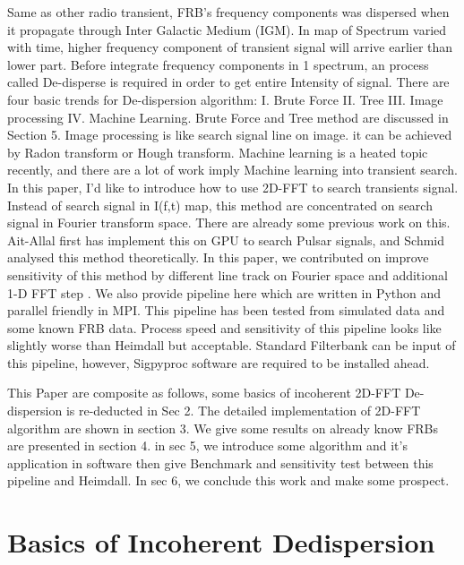 \documentclass[iop]{emulateapj}
\begin{document}
  Same as other radio transient, FRB's frequency components was dispersed when it propagate through Inter Galactic Medium (IGM). In map of Spectrum varied with time, higher frequency component of transient signal will arrive earlier than lower part. Before integrate frequency components in 1 spectrum,  an process called De-disperse is required in order to get entire Intensity of signal. There are four basic trends for De-dispersion algorithm: I. Brute Force II. Tree III. Image processing IV. Machine Learning. Brute Force and Tree method are discussed in Section 5.  Image processing is like search signal line on image. it can be achieved by Radon transform or Hough transform. Machine learning is a heated topic recently, and there are a lot of work imply Machine learning into transient search. In this paper, I'd like to introduce how to use 2D-FFT to search transients signal.  Instead of search signal in I(f,t) map, this method are concentrated on search signal in Fourier transform space. There are already some previous work on this. Ait-Allal first has implement this on GPU to search Pulsar signals, and Schmid analysed this method theoretically. In this paper, we contributed on improve sensitivity of this method by different line track on Fourier space and additional 1-D FFT step . We also provide pipeline here which are written in Python and parallel friendly in MPI. This pipeline has been tested from simulated data and some known FRB data. Process speed and sensitivity of this pipeline looks like slightly worse than Heimdall but acceptable.  Standard Filterbank can be input of this pipeline, however, Sigpyproc software are required to be installed ahead. 
  
  This Paper are composite as follows, some basics of incoherent 2D-FFT De-dispersion is re-deducted in Sec 2. The detailed implementation of 2D-FFT algorithm are shown in section 3. We give some results on already know FRBs are presented in section 4. in sec 5, we introduce some algorithm and it's application in software then give Benchmark and sensitivity test between this pipeline and Heimdall. In sec 6, we conclude this work and make some prospect.



\section{Basics of Incoherent Dedispersion}
\label{sec:obs}
\end{document}
